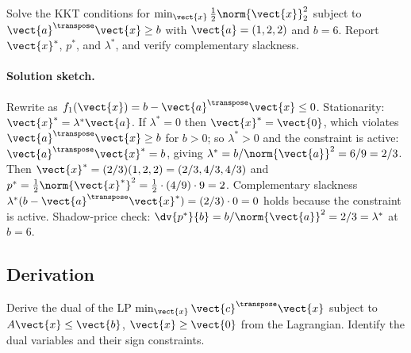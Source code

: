 \begin{exercise}
Solve the KKT conditions for $\min_{\vect{x}} \tfrac{1}{2}
\norm{\vect{x}}_{2}^{2}$ subject to $\vect{a}^{\transpose}
\vect{x} \geq b$ with $\vect{a} = (1, 2, 2)$ and $b = 6$. Report
$\vect{x}^{*}$, $p^{*}$, and $\lambda^{*}$, and verify
complementary slackness.
\end{exercise}

\paragraph{Solution sketch.}
Rewrite as $f_{1}(\vect{x}) = b - \vect{a}^{\transpose} \vect{x}
\leq 0$. Stationarity: $\vect{x}^{*} = \lambda^{*} \vect{a}$. If
$\lambda^{*} = 0$ then $\vect{x}^{*} = \vect{0}$, which violates
$\vect{a}^{\transpose} \vect{x} \geq b$ for $b > 0$; so
$\lambda^{*} > 0$ and the constraint is active:
$\vect{a}^{\transpose} \vect{x}^{*} = b$, giving $\lambda^{*} =
b / \norm{\vect{a}}^{2} = 6 / 9 = 2/3$. Then $\vect{x}^{*} =
(2/3)(1, 2, 2) = (2/3, 4/3, 4/3)$ and $p^{*} = \tfrac{1}{2}
\norm{\vect{x}^{*}}^{2} = \tfrac{1}{2} \cdot (4/9) \cdot 9 = 2$.
Complementary slackness $\lambda^{*} (b - \vect{a}^{\transpose}
\vect{x}^{*}) = (2/3) \cdot 0 = 0$ holds because the constraint is
active. Shadow-price check: $\dv{p^{*}}{b} = b / \norm{\vect{a}}^{2}
= 2/3 = \lambda^{*}$ at $b = 6$.

\subsection*{Derivation}

\begin{exercise}
Derive the dual of the LP $\min_{\vect{x}} \vect{c}^{\transpose}
\vect{x}$ subject to $A \vect{x} \leq \vect{b}$, $\vect{x} \geq
\vect{0}$ from the Lagrangian. Identify the dual variables and
their sign constraints.
\end{exercise}

